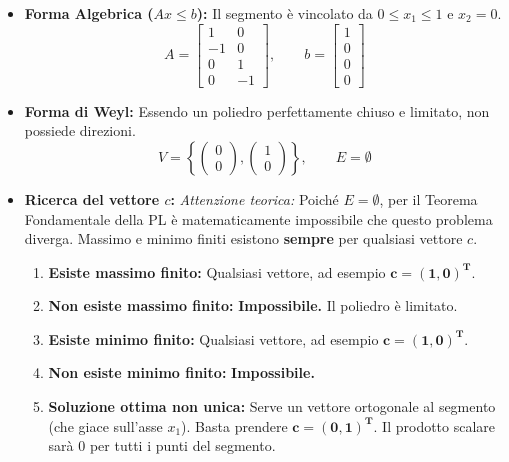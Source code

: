 \documentclass[12pt, a4paper]{article}
\begin{document}
	\begin{itemize}[label=\textcolor{titlecolor}{\Large\textbullet}, itemsep=4pt, leftmargin=1.5cm]
		\item \textbf{Forma Algebrica ($Ax \leq b$):} Il segmento è vincolato da $0 \leq x_1 \leq 1$ e $x_2 = 0$.
		\[
		A = \begin{bmatrix} 1 & 0 \\ -1 & 0 \\ 0 & 1 \\ 0 & -1 \end{bmatrix}, \qquad b = \begin{bmatrix} 1 \\ 0 \\ 0 \\ 0 \end{bmatrix}
		\]
		\item \textbf{Forma di Weyl:} Essendo un poliedro perfettamente chiuso e limitato, non possiede direzioni.
		\[
		V = \left\{ \begin{pmatrix} 0 \\ 0 \end{pmatrix}, \begin{pmatrix} 1 \\ 0 \end{pmatrix} \right\}, \qquad E = \emptyset
		\]
		\item \textbf{Ricerca del vettore $c$:} \textit{Attenzione teorica:} Poiché $E = \emptyset$, per il Teorema Fondamentale della PL è matematicamente impossibile che questo problema diverga. Massimo e minimo finiti esistono \textbf{sempre} per qualsiasi vettore $c$.
		\begin{enumerate}[label=\alph*)]
			\item \textbf{Esiste massimo finito:} Qualsiasi vettore, ad esempio $\mathbf{c = (1, 0)^T}$.
			\item \textbf{Non esiste massimo finito:} \textbf{Impossibile.} Il poliedro è limitato.
			\item \textbf{Esiste minimo finito:} Qualsiasi vettore, ad esempio $\mathbf{c = (1, 0)^T}$.
			\item \textbf{Non esiste minimo finito:} \textbf{Impossibile.}
			\item \textbf{Soluzione ottima non unica:} Serve un vettore ortogonale al segmento (che giace sull'asse $x_1$). Basta prendere $\mathbf{c = (0, 1)^T}$. Il prodotto scalare sarà $0$ per tutti i punti del segmento.
		\end{enumerate}
	\end{itemize}
	
\end{document}
